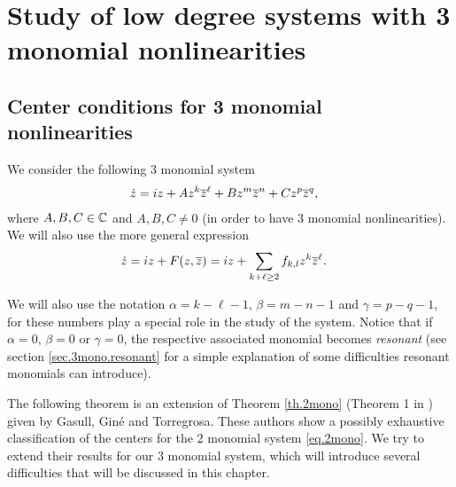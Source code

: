 \chapter{Study of low degree systems with 3 monomial nonlinearities}

\section{Center conditions for 3 monomial nonlinearities}

We consider the following 3 monomial system
\begin{align}
\dot z &= iz + Az^k\overline{z}^\ell + Bz^m\overline{z}^n + Cz^p\overline{z}^q,
\label{eq.system}
\end{align}
where $A,B,C\in\mathbb{C}$ and $A,B,C\ne0$ (in order to have 3 monomial nonlinearities). We will also use the more general expression
\begin{align}
\dot z &= iz+F(z,\overline{z}) = iz+\sum_{k+\ell\ge2}f_{k,l}z^k\overline{z}^\ell.
\label{eq.system2}
\end{align}

We will also use the notation $\alpha=k-\ell-1$, $\beta=m-n-1$ and $\gamma=p-q-1$, for these numbers play a special role in the study of the system. Notice that if $\alpha=0$, $\beta=0$ or $\gamma=0$, the respective associated monomial becomes \emph{resonant} (see section \ref{sec.3mono.resonant} for a simple explanation of some difficulties resonant monomials can introduce).

The following theorem is an extension of Theorem \ref{th.2mono} (Theorem 1 in ) given by Gasull, Giné and Torregrosa. These authors show a possibly exhaustive classification of the centers for the 2 monomial system \eqref{eq.2mono}. We try to extend their results for our 3 monomial system, which will introduce several difficulties that will be discussed in this chapter.

